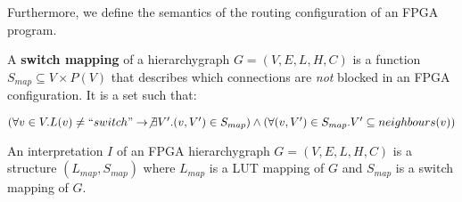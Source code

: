 Furthermore, we define the semantics of the routing configuration of an FPGA program.

\begin{defn}
\label{def:switch_mapping}
A \textbf{switch mapping} of a hierarchygraph $G=(V, E, L, H, C)$ is a function $S_{map} \subseteq V \times P(V)$ that describes which connections are \textit{not} blocked in an FPGA configuration. It is a set such that:

$(\forall v \in V. L(v) \neq ``switch" \to \not \exists V' . (v, V') \in S_{map}) \land (\forall (v, V') \in S_{map}. V' \subseteq neighbours(v))$
\end{defn}

\begin{defn}[Interpretation]
\label{def:interpretation}
An interpretation $I$ of an FPGA hierarchygraph $G=(V,E,L,H,C)$ is a structure $(L_{map}, S_{map})$ where $L_{map}$ is a LUT mapping of $G$ and $S_{map}$ is a switch mapping of $G$. 
\end{defn}

